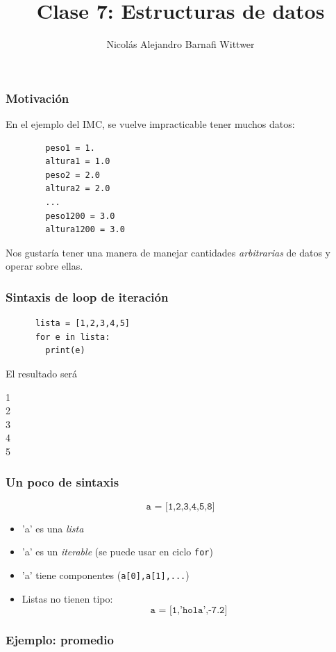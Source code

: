 \documentclass[14pt,aspectratio=169,xcolor=dvipsnames]{beamer}
\title[short title]{Clase 7: Estructuras de datos}
\subtitle{}
\author[NA Barnafi] {Nicolás Alejandro Barnafi Wittwer}
\institute[UC|CMM] 
{
    Pontificia Universidad Católica de Chile \\
    Centro de Modelamiento Matemático
}
\begin{document}
\begin{frame}
    \maketitle
\end{frame}
\begin{frame}[fragile]\frametitle{Motivación}
En el ejemplo del IMC, se vuelve impracticable tener muchos datos:
    \begin{verbatim}
        peso1 = 1.
        altura1 = 1.0
        peso2 = 2.0 
        altura2 = 2.0
        ...
        peso1200 = 3.0
        altura1200 = 3.0
    \end{verbatim}

Nos gustaría tener una manera de manejar cantidades \emph{arbitrarias} de datos y operar sobre ellas.
\end{frame}
\begin{frame}[fragile]\frametitle{Sintaxis de loop de iteración}
    \begin{verbatim}
      lista = [1,2,3,4,5]
      for e in lista:
        print(e)
    \end{verbatim}
\pause El resultado será

1\\
2\\
3\\
4\\
5
\end{frame}
\begin{frame}\frametitle{Un poco de sintaxis}
    $$ \texttt{a = [1,2,3,4,5,8]} $$
    \begin{itemize}
        \item<+-> 'a' es una \emph{lista}
        \item<+-> 'a' es un \emph{iterable} (se puede usar en ciclo \texttt{for})
        \item<+-> 'a' tiene componentes (\texttt{a[0],a[1],...})
        \item<+-> Listas no tienen tipo: 
            $$ \texttt{a = [1,'hola',-7.2]} $$
    \end{itemize}
\end{frame}
\begin{frame}\frametitle{Ejemplo: promedio}
\end{frame}
\end{document}
